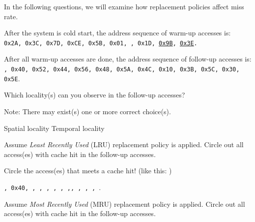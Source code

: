 \begin{questions}
{\begin{solution}
    

    \end{solution}
}
\newpage

In the following questions, we will examine how replacement policies
affect miss rate.


After the system is cold start, the address sequence of warm-up
accesses is:\\
\texttt{0x2A, 0x3C, 0x7D, 0xCE, 0x5B, 0x01, , 0x1D, \uline{0x9B}, \uline{0x3E}.}

After all warm-up accesses are done, the address sequence of
follow-up accesses is: \\
\texttt{, 0x40, 0x52, 0x44, 0x56, 0x48, 0x5A, 0x4C, 0x10, 0x3B,
0x5C, 0x30, 0x5E}.

\question[2] Which locality(s) can you observe in the follow-up
accesses?

{

    \begin{solution}
        Note: There may exist(s) one or more correct choice(s).\\
        \begin{oneparcheckboxes}
            \CorrectChoice Spatial locality
            \CorrectChoice Temporal locality
        \end{oneparcheckboxes}
    \end{solution}

}

\question[2] Assume \emph{Least Recently Used} (LRU) replacement
policy is applied. Circle out all access(es) with cache hit in
the follow-up accesses. \label{q:lru}

{
    \begin{solution}
        Circle the access(es) that meets a cache hit!
        (like this: \texttt{})\\
        \begin{center}
        \texttt{, 0x40, , , , , , ,,
        , , , }.
        \end{center}
        \vspace{10px}
    \end{solution}
}

\question[2] Assume \emph{Most Recently Used} (MRU) replacement policy
is applied. Circle out all access(es) with cache hit in the follow-up
accesses. \label{q:mru}


\end{questions}
